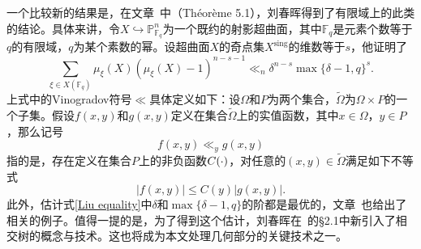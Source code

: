 一个比较新的结果是，在文章~中（Th\'eor\`eme 5.1），刘春晖得到了有限域上的此类的结论。具体来讲，令$X \hookrightarrow \mathbb{P}^n_{\mathbb{F}_q}$为一个既约的射影超曲面，其中$\mathbb{F}_q$是元素个数等于$q$的有限域，$q$为某个素数的幂。设超曲面$X$的奇点集$X^{\mathrm{sing}}$的维数等于$s$，他证明了
\begin{equation} \label{Liu equality}
\sum_{\xi\in X(\mathbb{F}_q)} \mu_{\xi}(X)(\mu_\xi(X)-1)^{n-s-1}\ll_n\delta^{n-s}\max\{\delta-1,q\}^{s}.
\end{equation}
上式中的Vinogradov符号$\ll$具体定义如下：设$\Omega$和$P$为两个集合，$\widetilde{\Omega}$为$\Omega\times P$的一个子集。假设$f(x,y)$和$g(x,y)$定义在集合$\widetilde{\Omega}$上的实值函数，其中$x\in\Omega$，$y\in P$，那么记号
\begin{equation}
f(x,y) \ll_{y} g(x,y)
\end{equation}
指的是，存在定义在集合$P$上的非负函数$C(\ndot)$，对任意的$(x,y) \in \widetilde{\Omega}$满足如下不等式
\begin{equation}
|f(x,y)| \leqslant C(y)|g(x,y)|.
\end{equation}
此外，估计式\eqref{Liu equality}中$\delta$和$\max\{\delta-1,q\}$的阶都是最优的，文章~也给出了相关的例子。值得一提的是，为了得到这个估计，刘春晖在~的\S 2.1中新引入了相交树的概念与技术。这也将成为本文处理几何部分的关键技术之一。

